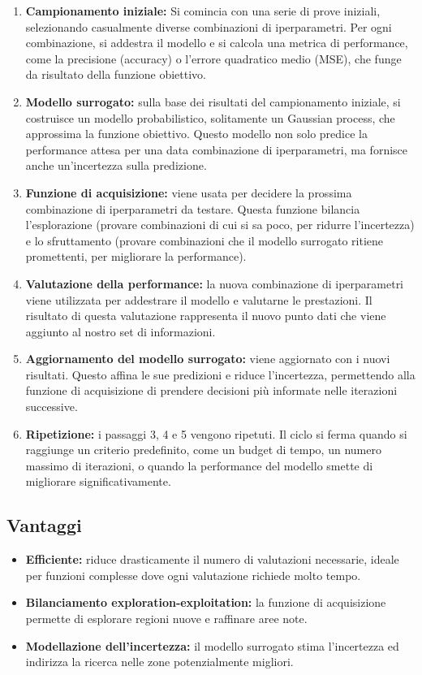 \documentclass[a4paper,12pt]{report}
\begin{document}
	\begin{enumerate}
		\item \textbf{Campionamento iniziale:} Si comincia con una serie di prove iniziali, selezionando casualmente diverse combinazioni di iperparametri. Per ogni combinazione, si addestra il modello e si calcola una metrica di performance, come la precisione (accuracy) o l'errore quadratico medio (MSE), che funge da risultato della funzione obiettivo.
		\item \textbf{Modello surrogato:} sulla base dei risultati del campionamento iniziale, si costruisce un modello probabilistico, solitamente un Gaussian process, che approssima la funzione obiettivo. Questo modello non solo predice la performance attesa per una data combinazione di iperparametri, ma fornisce anche un'incertezza sulla predizione.
		\item \textbf{Funzione di acquisizione:} viene usata per decidere la prossima combinazione di iperparametri da testare. Questa funzione bilancia l'esplorazione (provare combinazioni di cui si sa poco, per ridurre l'incertezza) e lo sfruttamento (provare combinazioni che il modello surrogato ritiene promettenti, per migliorare la performance).
		\item \textbf{Valutazione della performance:} la nuova combinazione di iperparametri viene utilizzata per addestrare il modello e valutarne le prestazioni. Il risultato di questa valutazione rappresenta il nuovo punto dati che viene aggiunto al nostro set di informazioni.
		\item \textbf{Aggiornamento del modello surrogato:} viene aggiornato con i nuovi risultati. Questo affina le sue predizioni e riduce l'incertezza, permettendo alla funzione di acquisizione di prendere decisioni più informate nelle iterazioni successive.
		\item \textbf{Ripetizione:} i passaggi 3, 4 e 5 vengono ripetuti. Il ciclo si ferma quando si raggiunge un criterio predefinito, come un budget di tempo, un numero massimo di iterazioni, o quando la performance del modello smette di migliorare significativamente.
	\end{enumerate}
	
	\subsection{Vantaggi}
	\begin{itemize}
		\item \textbf{Efficiente:} riduce drasticamente il numero di valutazioni necessarie, ideale per funzioni complesse dove ogni valutazione richiede molto tempo.
		\item \textbf{Bilanciamento exploration-exploitation:} la funzione di acquisizione permette di esplorare regioni nuove e raffinare aree note.
		\item \textbf{Modellazione dell’incertezza:} il modello surrogato stima l’incertezza ed indirizza la ricerca nelle zone potenzialmente migliori.
	\end{itemize}
	
\end{document}
